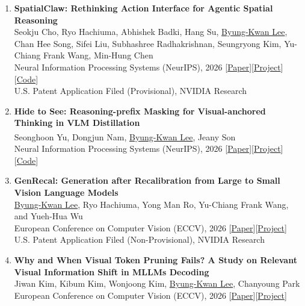 \documentclass[a4paper,11pt]{article}
\begin{document}
{\begin{enumerate}[leftmargin=2.2em, labelsep=0.6em, align=left, itemindent=0em, label={\color{accentDark}\textbf{\arabic*.}}]
\item \textbf{SpatialClaw: Rethinking Action Interface for Agentic Spatial Reasoning}
\\\vspace{1mm}Seokju Cho, Ryo Hachiuma, Abhishek Badki, Hang Su, \underline{Byung-Kwan Lee}, Chan Hee Song, Sifei Liu, Subhashree Radhakrishnan, Seungryong Kim, Yu-Chiang Frank Wang, Min-Hung Chen
\\\vspace{2mm}Neural Information Processing Systems (NeurIPS), 2026 [\href{https://arxiv.org/abs/2606.13673}{Paper}][\href{https://spatialclaw.github.io}{Project}][\href{https://github.com/NVlabs/SpatialClaw}{Code}]
\\\vspace{2mm}U.S. Patent Application Filed (Provisional), NVIDIA Research

\item \textbf{Hide to See: Reasoning-prefix Masking for Visual-anchored Thinking in VLM Distillation}
\\\vspace{1mm}Seonghoon Yu, Dongjun Nam, \underline{Byung-Kwan Lee}\textsuperscript{\dag}, Jeany Son\textsuperscript{\dag}
\\\vspace{2mm}Neural Information Processing Systems (NeurIPS), 2026 [\href{https://arxiv.org/abs/2605.11651}{Paper}][\href{https://seonghoon-yu.github.io/Masking-KD-Page/}{Project}][\href{https://github.com/Seonghoon-Yu/Masking-KD}{Code}]

\item \textbf{GenRecal: Generation after Recalibration from Large to Small Vision Language Models}
\\\vspace{1mm}\underline{Byung-Kwan Lee}, Ryo Hachiuma, Yong Man Ro, Yu-Chiang Frank Wang, and Yueh-Hua Wu
\\\vspace{2mm}European Conference on Computer Vision (ECCV), 2026 [\href{https://arxiv.org/abs/2506.15681}{Paper}][\href{https://byungkwanlee.github.io/GenRecal-page/}{Project}]
\\\vspace{2mm}U.S. Patent Application Filed (Non-Provisional), NVIDIA Research

\item \textbf{Why and When Visual Token Pruning Fails? A Study on Relevant Visual Information Shift in MLLMs Decoding}
\\\vspace{1mm}Jiwan Kim, Kibum Kim, Wonjoong Kim, \underline{Byung-Kwan Lee}, Chanyoung Park
\\\vspace{2mm}European Conference on Computer Vision (ECCV), 2026 [\href{https://arxiv.org/abs/2604.12358}{Paper}][\href{https://ptkjw1997.github.io/DSTP-page/}{Project}]


\end{enumerate}}
\end{document}
